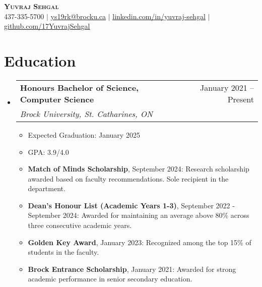\documentclass[letterpaper,11pt]{article}
\makeatletter
\newcommand{\resumeItem}[1]{
  \item\small{
    {#1 \vspace{-2pt}}
  }
}
\newcommand{\resumeSubheading}[4]{
  \vspace{-2pt}\item
    \begin{tabular*}{0.97\textwidth}[t]{l@{\extracolsep{\fill}}r}
      \textbf{#1} & #2 \\
      \textit{\small#3} & \textit{\small #4} \\
    \end{tabular*}\vspace{-7pt}
}
\newcommand{\resumeSubHeadingListStart}{\begin{itemize}[leftmargin=0.15in, label={}]}
\newcommand{\resumeSubHeadingListEnd}{\end{itemize}}
\newcommand{\resumeItemListStart}{\begin{itemize}}
\newcommand{\resumeItemListEnd}{\end{itemize}\vspace{-5pt}}
\makeatother
\begin{document}
\begin{center}
    \textbf{\Large \scshape Yuvraj Sehgal}\\
    \small 437-335-5700 $|$ \href{mailto:ys19rk@brocku.ca4}{\underline{ys19rk@brocku.ca}} $|$ \href{https://ca.linkedin.com/in/yuvraj-sehgal}{\underline{linkedin.com/in/yuvraj-sehgal}} $|$ \href{https://github.com/17YuvrajSehgal}{\underline{github.com/17YuvrajSehgal}}
\end{center}

\section{Education}
\resumeSubHeadingListStart
  \resumeSubheading
    {Honours Bachelor of Science, Computer Science}{January 2021 -- Present}
    {Brock University, St. Catharines, ON}{}
    \resumeItemListStart
      \resumeItem{Expected Graduation:}{January 2025}
      \resumeItem{GPA:}{3.9/4.0}
      \resumeItem{\textbf{Match of Minds Scholarship}, September 2024:}{Research scholarship awarded based on faculty recommendations. Sole recipient in the department.}
      \resumeItem{\textbf{Dean's Honour List (Academic Years 1-3)}, September 2022 - September 2024:}{Awarded for maintaining an average above 80\% across three consecutive academic years.}
      \resumeItem{\textbf{Golden Key Award}, January 2023:}{Recognized among the top 15\% of students in the faculty.}
      \resumeItem{\textbf{Brock Entrance Scholarship}, January 2021:}{Awarded for strong academic performance in senior secondary education.}
    \resumeItemListEnd
\resumeSubHeadingListEnd




\end{document}
